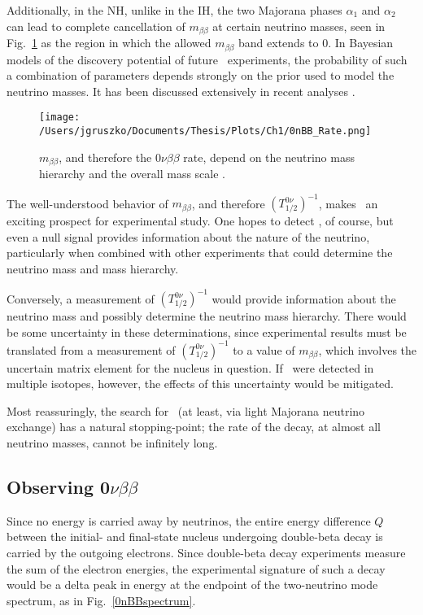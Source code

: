 Additionally, in the NH, unlike in the IH, the two Majorana phases $\alpha_1$ and $\alpha_2$ can lead to complete cancellation of $m_{\beta\beta}$ at certain neutrino masses, seen in Fig.~\ref{0nBBrate} as the region in which the allowed $m_{\beta\beta}$ band extends to 0. In Bayesian models of the discovery potential of future \nonubb\ experiments, the probability of such a combination of parameters depends strongly on the prior used to model the neutrino masses. It has been discussed extensively in recent analyses \cite{Agostini2017} \cite{Caldwell2017}. 
 
  \begin{figure}[h]
 \centering
 \texttt{[image: /Users/jgruszko/Documents/Thesis/Plots/Ch1/0nBB\_Rate.png]}
  \caption{$m_{\beta\beta}$, and therefore the $0\nu\beta\beta$ rate, depend on the neutrino mass hierarchy and the overall mass scale \cite{ZuberINT2015} .}
  \label{0nBBrate}
  \end{figure}   
  
The well-understood behavior of $m_{\beta\beta}$, and therefore $(T_{1/2}^{0\nu})^{-1}$, makes \nonubb\ an exciting prospect for experimental study. One hopes to detect \nonubb, of course, but even a null signal provides information about the nature of the neutrino, particularly when combined with other experiments that could determine the neutrino mass and mass hierarchy. 

Conversely, a measurement of $(T_{1/2}^{0\nu})^{-1}$ would provide information about the neutrino mass and possibly determine the neutrino mass hierarchy. There would be some uncertainty in these determinations, since experimental results must be translated from a measurement of $(T_{1/2}^{0\nu})^{-1}$ to a value of $m_{\beta\beta}$, which involves the uncertain matrix element for the nucleus in question. If \nonubb\ were detected in multiple isotopes, however, the effects of this uncertainty would be mitigated. 

Most reassuringly, the search for \nonubb\ (at least, via light Majorana neutrino exchange) has a natural stopping-point; the rate of the decay, at almost all neutrino masses, cannot be infinitely long. 

\subsection{Observing 0$\nu\beta\beta$}
Since no energy is carried away by neutrinos, the entire energy difference $Q$ between the initial- and final-state nucleus undergoing double-beta decay is carried by the outgoing electrons. Since double-beta decay experiments measure the sum of the electron energies, the experimental signature of such a decay would be a delta peak in energy at the endpoint of the two-neutrino mode spectrum, as in Fig.~\ref{0nBBspectrum}.

